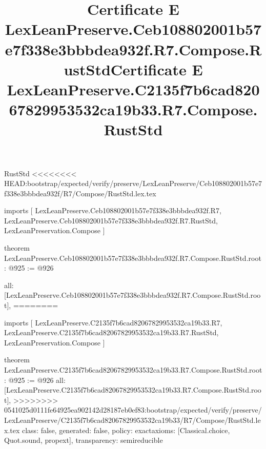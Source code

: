 \begin{lexlean}{RustStd}
<<<<<<<< HEAD:bootstrap/expected/verify/preserve/LexLeanPreserve/Ceb108802001b57e7f338e3bbbdea932f/R7/Compose/RustStd.lex.tex
\title{Certificate E LexLeanPreserve.Ceb108802001b57e7f338e3bbbdea932f.R7.Compose.RustStd}
\begin{coremodule}
imports [
  LexLeanPreserve.Ceb108802001b57e7f338e3bbbdea932f.R7,
  LexLeanPreserve.Ceb108802001b57e7f338e3bbbdea932f.R7.RustStd,
  LexLeanPreservation.Compose
]

theorem LexLeanPreserve.Ceb108802001b57e7f338e3bbbdea932f.R7.Compose.RustStd.root : @925 := @926 {
  all: [LexLeanPreserve.Ceb108802001b57e7f338e3bbbdea932f.R7.Compose.RustStd.root],
========
\title{Certificate E LexLeanPreserve.C2135f7b6cad82067829953532ca19b33.R7.Compose.RustStd}
\begin{coremodule}
imports [
  LexLeanPreserve.C2135f7b6cad82067829953532ca19b33.R7,
  LexLeanPreserve.C2135f7b6cad82067829953532ca19b33.R7.RustStd,
  LexLeanPreservation.Compose
]

theorem LexLeanPreserve.C2135f7b6cad82067829953532ca19b33.R7.Compose.RustStd.root : @925 := @926 {
  all: [LexLeanPreserve.C2135f7b6cad82067829953532ca19b33.R7.Compose.RustStd.root],
>>>>>>>> 0541025d0111fe64925ea902142d28187eb0ef83:bootstrap/expected/verify/preserve/LexLeanPreserve/C2135f7b6cad82067829953532ca19b33/R7/Compose/RustStd.lex.tex
  class: false,
  generated: false,
  policy: exact{axioms: [Classical.choice, Quot.sound, propext]},
  transparency: semireducible
}


\end{coremodule}}
\end{coremodule}
\end{lexlean}
